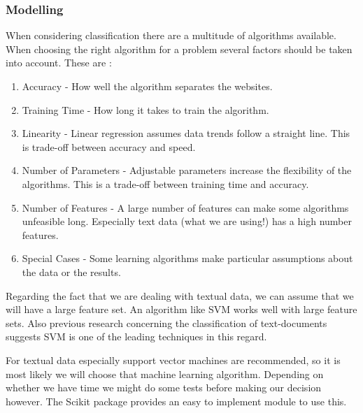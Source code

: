 \subsubsection{Modelling}
When considering classification there are a multitude of algorithms available. When choosing the right algorithm for a problem several factors should be taken into account. These are \cite{MLCheatSheet}:
    \begin{enumerate}
        \item Accuracy - How well the algorithm separates the websites.
        \item Training Time - How long it takes to train the algorithm.
        \item Linearity - Linear regression assumes data trends follow a straight line. This is trade-off between accuracy and speed.
        \item Number of Parameters - Adjustable parameters increase the flexibility of the algorithms. This is a trade-off between training time and accuracy.
        \item Number of Features - A large number of features can make some algorithms unfeasible long. Especially text data (what we are using!) has a high number features.
        \item Special Cases - Some learning algorithms make particular assumptions about the data or the results.
    \end{enumerate}

Regarding the fact that we are dealing with textual data, we can assume that we will have a large feature set. An algorithm like SVM \cite{ml_text} works well with large feature sets\cite{MLCheatSheet}.
Also previous research concerning the classification of text-documents suggests SVM is one of the leading techniques in this regard\cite{ml_text}.

    
For textual data especially support vector machines are recommended\cite{MLCheatSheet, ml_text}, so it is most likely we will choose that machine learning algorithm. Depending on whether we have time we might do some tests before making our decision however. The Scikit package\cite{scikit-learn} provides an easy to implement module to use this.

